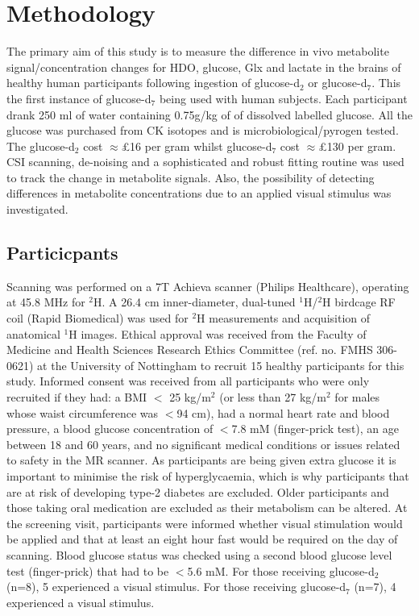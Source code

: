 \section{Methodology}

The primary aim of this study is to measure the difference in vivo metabolite signal/concentration changes for \ac{HDO}, glucose, Glx and lactate in the brains of healthy human participants following ingestion of glucose-d$_2$ or glucose-d$_7$. This the first instance of glucose-d$_7$ being used with human subjects. Each participant drank 250 ml of water containing 0.75g/kg of of dissolved labelled glucose. All the glucose was purchased from CK isotopes and is microbiological/pyrogen tested. The glucose-d$_2$ cost $\approx$\pounds16 per gram whilst glucose-d$_7$ cost $\approx$\pounds130 per gram.  \ac{CSI} scanning, de-noising and a sophisticated and robust fitting routine was used to track the change in metabolite signals. Also, the possibility of detecting differences in metabolite concentrations due to an applied visual stimulus was investigated.


\subsection{Particicpants}

Scanning was performed on a 7T Achieva scanner (Philips Healthcare), operating at 45.8 MHz for $^2$H. A 26.4 cm inner-diameter, dual-tuned $^1$H/$^2$H birdcage \ac{RF} coil (Rapid Biomedical) was used for $^2$H measurements and acquisition of anatomical $^1$H images. Ethical approval was received from the Faculty of Medicine and Health Sciences Research Ethics Committee (ref. no. FMHS 306-0621) at the University of Nottingham to recruit 15 healthy participants for this study. Informed consent was received from all participants who were only recruited if they had: a \ac{BMI} $<$ 25 kg/m$^2$ (or less than 27 kg/m$^2$ for males whose waist circumference was $<$94 cm), had a normal heart rate and blood pressure, a blood glucose concentration of $<$7.8 mM (finger-prick test), an age between 18 and 60 years, and no significant medical conditions or issues related to safety in the MR scanner. As participants are being given extra glucose it is important to minimise the risk of hyperglycaemia, which is why participants that are at risk of developing type-2 diabetes are excluded. Older participants and those taking oral medication are excluded as their metabolism can be altered. At the screening visit, participants were informed whether visual stimulation would be applied and that at least an eight hour fast would be required on the day of scanning. Blood glucose status was checked using a second blood glucose level test (finger-prick) that had to be $<$5.6 mM. For those receiving glucose-d$_2$ (n=8), 5 experienced a visual stimulus. For those receiving glucose-d$_7$ (n=7), 4 experienced a visual stimulus.

